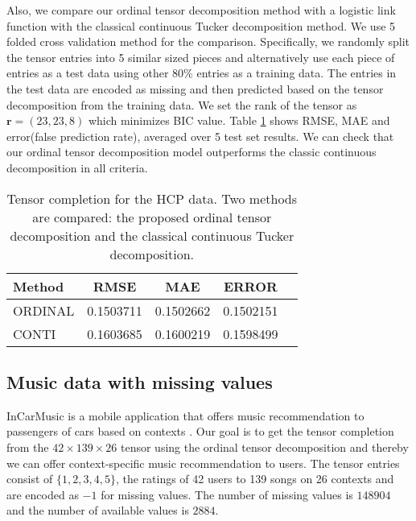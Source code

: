 \documentclass{article}
\theoremstyle{plain}
\theoremstyle{definition}
\begin{document}
Also, we compare our ordinal tensor decomposition method with a logistic link function with the classical continuous Tucker decomposition method. We use 5 folded cross validation method for the comparison. Specifically, we randomly split the tensor entries into 5 similar sized pieces and alternatively use each piece of entries as a test data using other $80\%$ entries as a training data. The entries in the test data are encoded as missing and then predicted based on the tensor decomposition from the training data. We set the rank of the tensor as $\bm r = (23,23,8)$ which minimizes BIC value. Table \ref{CV} shows RMSE, MAE and error(false prediction rate), averaged over 5 test set results. We can check that our ordinal tensor decomposition model outperforms the classic continuous decomposition in all criteria.

\begin{table}[t]
\caption{Tensor completion for the HCP data. Two methods are compared: the proposed ordinal tensor decomposition and the classical continuous Tucker decomposition.}
\label{CV}
\vskip 0.15in
\begin{center}
\begin{small}
\begin{sc}
\begin{tabular}{lcccr}
\toprule
Method & RMSE & MAE & ERROR \\
\midrule
ORDINAL   & 0.1503711 & 0.1502662 & 0.1502151 \\
CONTI & 0.1603685& 0.1600219& 0.1598499\\
\bottomrule
\end{tabular}
\end{sc}
\end{small}
\end{center}
\vskip -0.1in
\end{table}

\subsection{Music data with missing values}

InCarMusic is a mobile application that offers music recommendation to passengers of cars based on contexts \citep{Baltrunas2011InCarMusicCM}.
Our goal is to get the tensor completion from the $42\times139\times 26$ tensor using the ordinal tensor decomposition and thereby we can offer context-specific music recommendation to users.
The tensor entries consist of $\{1,2,3,4,5\}$, the ratings of 42 users to 139 songs on 26 contexts and are encoded as $-1$ for missing values. The number of missing values is $148904$ and the number of available values is $2884$.



\end{document}
